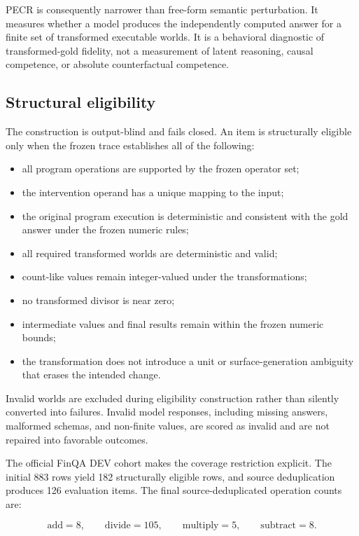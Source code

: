 \documentclass[11pt]{article}
\begin{document}
PECR is consequently narrower than free-form semantic perturbation. It measures whether a model produces the independently computed answer for a finite set of transformed executable worlds. It is a behavioral diagnostic of transformed-gold fidelity, not a measurement of latent reasoning, causal competence, or absolute counterfactual competence.

\subsection{Structural eligibility}

The construction is output-blind and fails closed. An item is structurally eligible only when the frozen trace establishes all of the following:

\begin{itemize}
  \item all program operations are supported by the frozen operator set;
  \item the intervention operand has a unique mapping to the input;
  \item the original program execution is deterministic and consistent with the gold answer under the frozen numeric rules;
  \item all required transformed worlds are deterministic and valid;
  \item count-like values remain integer-valued under the transformations;
  \item no transformed divisor is near zero;
  \item intermediate values and final results remain within the frozen numeric bounds;
  \item the transformation does not introduce a unit or surface-generation ambiguity that erases the intended change.
\end{itemize}

Invalid worlds are excluded during eligibility construction rather than silently converted into failures. Invalid model responses, including missing answers, malformed schemas, and non-finite values, are scored as invalid and are not repaired into favorable outcomes.

The official FinQA DEV cohort makes the coverage restriction explicit. The initial 883 rows yield 182 structurally eligible rows, and source deduplication produces 126 evaluation items. The final source-deduplicated operation counts are:

\[
\text{add}=8,\qquad
\text{divide}=105,\qquad
\text{multiply}=5,\qquad
\text{subtract}=8.
\]
\end{document}
